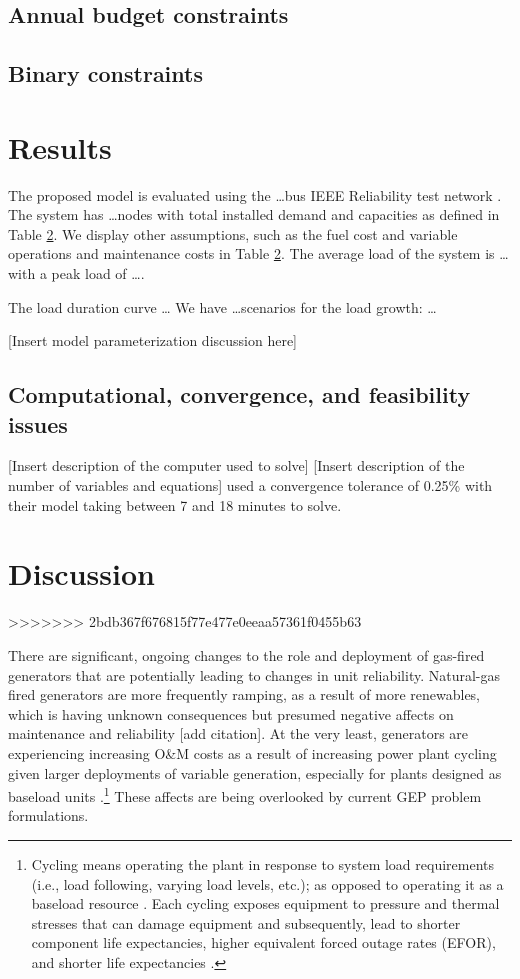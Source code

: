 \documentclass[10pt]{amsart}
\begin{document}
\subsection{Annual budget constraints}
\subsection{Binary constraints}

\section{Results}
The proposed model is evaluated using the \ldots bus IEEE Reliability test network \parencite{}.
The system has \ldots nodes with total installed demand and capacities as defined in Table \ref{}. 
We display other assumptions, such as the fuel cost and variable operations and maintenance costs in Table \ref{}.
The average load of the system is \ldots with a peak load of \ldots.

The load duration curve \ldots
We have \ldots scenarios for the load growth: \ldots 

[Insert model parameterization discussion here]


\subsection{Computational, convergence, and feasibility issues}
[Insert description of the computer used to solve]
[Insert description of the number of variables and equations]
\cite{bakirtzis} used a convergence tolerance of 0.25\% with their model taking between 7 and 18 minutes to solve. 
\section{Discussion}
>>>>>>> 2bdb367f676815f77e477e0eeaa57361f0455b63

There are significant, ongoing changes to the role and deployment of gas-fired generators that are potentially leading to changes in unit reliability. 
Natural-gas fired generators are more frequently ramping, as a result of more renewables, which is having unknown consequences but presumed negative affects on maintenance and reliability [add citation].
At the very least, generators are experiencing increasing O\&M costs as a result of increasing power plant cycling given larger deployments of variable generation, especially for plants designed as baseload units \parencite{nrel:2012aa}.\footnote{Cycling means operating the plant in response to system load requirements (i.e., load following, varying load levels, etc.); as opposed to operating it as a baseload resource \parencite{nerc:2012aa}. Each cycling exposes equipment to pressure and thermal stresses that can damage equipment and subsequently, lead to shorter component life expectancies, higher equivalent forced outage rates (EFOR), and shorter life expectancies \parencite{nerc:2012aa}.} 
These affects are being overlooked by current GEP problem formulations.
\end{document}

